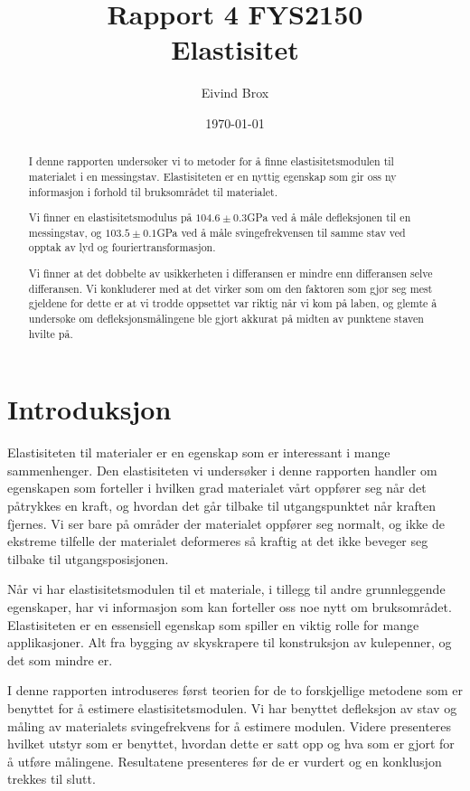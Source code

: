 \documentclass[a4paper,11pt, twocolumn]{article}
\title{Rapport 4 FYS2150\\Elastisitet}
\author{Eivind Brox}
\date{\today}
\begin{document}
\maketitle


\begin{abstract}
I denne rapporten undersøker vi to metoder for å finne elastisitetsmodulen til materialet i en messingstav. Elastisiteten er en nyttig egenskap som gir oss ny informasjon i forhold til bruksområdet til materialet. 

Vi finner en elastisitetsmodulus på $104.6\pm0.3$GPa ved å måle defleksjonen til en messingstav, og $103.5\pm0.1$GPa ved å måle svingefrekvensen til samme stav ved opptak av lyd og fouriertransformasjon.

Vi finner at det dobbelte av usikkerheten i differansen er mindre enn differansen selve differansen. Vi konkluderer med at det virker som om den faktoren som gjør seg mest gjeldene for dette er at vi trodde oppsettet var riktig når vi kom på laben, og glemte å undersøke om defleksjonsmålingene ble gjort akkurat på midten av punktene staven hvilte på.

\end{abstract}

\section{Introduksjon}
Elastisiteten til materialer er en egenskap som er interessant i mange sammenhenger. Den elastisiteten vi undersøker i denne rapporten handler om egenskapen som forteller i hvilken grad materialet vårt oppfører seg når det påtrykkes en kraft, og hvordan det går tilbake til utgangspunktet når kraften fjernes. Vi ser bare på områder der materialet oppfører seg normalt, og ikke de ekstreme tilfelle der materialet deformeres så kraftig at det ikke beveger seg tilbake til utgangsposisjonen.

Når vi har elastisitetsmodulen til et materiale, i tillegg til andre grunnleggende egenskaper, har vi informasjon som kan forteller oss noe nytt om bruksområdet. Elastisiteten er en essensiell egenskap som spiller en viktig rolle for mange applikasjoner. Alt fra bygging av skyskrapere til konstruksjon av kulepenner, og det som mindre er.

I denne rapporten introduseres først teorien for de to forskjellige metodene som er benyttet for å estimere elastisitetsmodulen. Vi har benyttet defleksjon av stav og måling av materialets svingefrekvens for å estimere modulen. Videre presenteres hvilket utstyr som er benyttet, hvordan dette er satt opp og hva som er gjort for å utføre målingene. Resultatene presenteres før de er vurdert og en konklusjon trekkes til slutt. 
  
\end{document}
